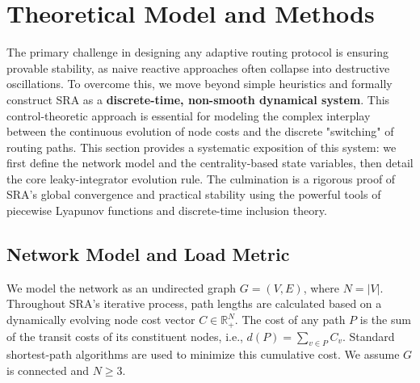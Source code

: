 \documentclass[journal]{IEEEtran}
\begin{document}
\section{Theoretical Model and Methods}
\label{sec:model}

The primary challenge in designing any adaptive routing protocol is ensuring provable stability, as naive reactive approaches often collapse into destructive oscillations. To overcome this, we move beyond simple heuristics and formally construct SRA as a \textbf{discrete-time, non-smooth dynamical system}. This control-theoretic approach is essential for modeling the complex interplay between the continuous evolution of node costs and the discrete "switching" of routing paths. This section provides a systematic exposition of this system: we first define the network model and the centrality-based state variables, then detail the core leaky-integrator evolution rule. The culmination is a rigorous proof of SRA's global convergence and practical stability using the powerful tools of piecewise Lyapunov functions and discrete-time inclusion theory. 

\subsection{Network Model and Load Metric}

We model the network as an undirected graph $G=(V,E)$, where $N=|V|$. Throughout SRA's iterative process, path lengths are calculated based on a dynamically evolving node cost vector $C \in \mathbb{R}^N_+$. The cost of any path $P$ is the sum of the transit costs of its constituent nodes, i.e., $d(P) = \sum_{v \in P} C_v$. Standard shortest-path algorithms are used to minimize this cumulative cost. We assume $G$ is connected and $N \ge 3$.
\end{document}
